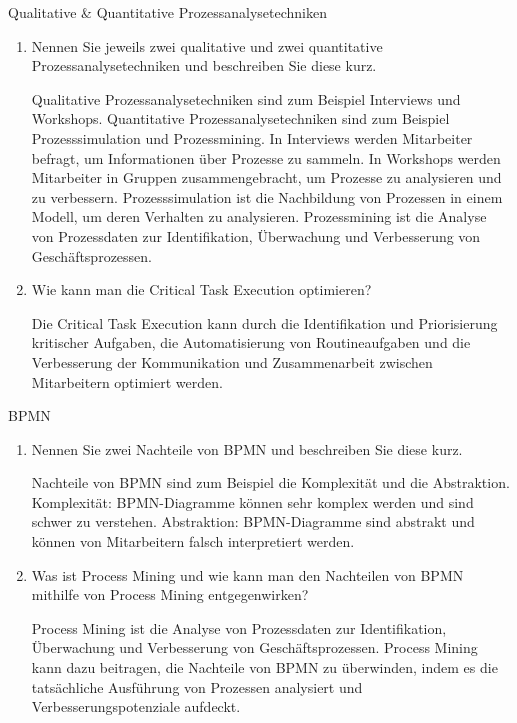\documentclass{article}
\begin{document}
\begin{exercise}{Qualitative \& Quantitative Prozessanalysetechniken}
  \begin{enumerate}
    \item Nennen Sie jeweils zwei qualitative und zwei quantitative Prozessanalysetechniken und beschreiben Sie diese kurz.
          \begin{solution}
            Qualitative Prozessanalysetechniken sind zum Beispiel Interviews und Workshops. Quantitative Prozessanalysetechniken sind zum Beispiel Prozesssimulation und Prozessmining.
            In Interviews werden Mitarbeiter befragt, um Informationen über Prozesse zu sammeln. In Workshops werden Mitarbeiter in Gruppen zusammengebracht, um Prozesse zu analysieren und zu verbessern.
            Prozesssimulation ist die Nachbildung von Prozessen in einem Modell, um deren Verhalten zu analysieren. Prozessmining ist die Analyse von Prozessdaten zur Identifikation, Überwachung und Verbesserung von Geschäftsprozessen.
          \end{solution}
    \item Wie kann man die Critical Task Execution optimieren?
          \begin{solution}
            Die Critical Task Execution kann durch die Identifikation und Priorisierung kritischer Aufgaben, die Automatisierung von Routineaufgaben und die Verbesserung der Kommunikation und Zusammenarbeit zwischen Mitarbeitern optimiert werden.
          \end{solution}
  \end{enumerate}
\end{exercise}

\begin{exercise}{BPMN}
  \begin{enumerate}
    \item Nennen Sie zwei Nachteile von BPMN und beschreiben Sie diese kurz.
          \begin{solution}
            Nachteile von BPMN sind zum Beispiel die Komplexität und die Abstraktion. Komplexität: BPMN-Diagramme können sehr komplex werden und sind schwer zu verstehen. Abstraktion: BPMN-Diagramme sind abstrakt und können von Mitarbeitern falsch interpretiert werden.
          \end{solution}
    \item Was ist Process Mining und wie kann man den Nachteilen von BPMN mithilfe von Process Mining entgegenwirken?
          \begin{solution}
            Process Mining ist die Analyse von Prozessdaten zur Identifikation, Überwachung und Verbesserung von Geschäftsprozessen. Process Mining kann dazu beitragen, die Nachteile von BPMN zu überwinden, indem es die tatsächliche Ausführung von Prozessen analysiert und Verbesserungspotenziale aufdeckt.
          \end{solution}
  \end{enumerate}
\end{exercise}
\end{document}
